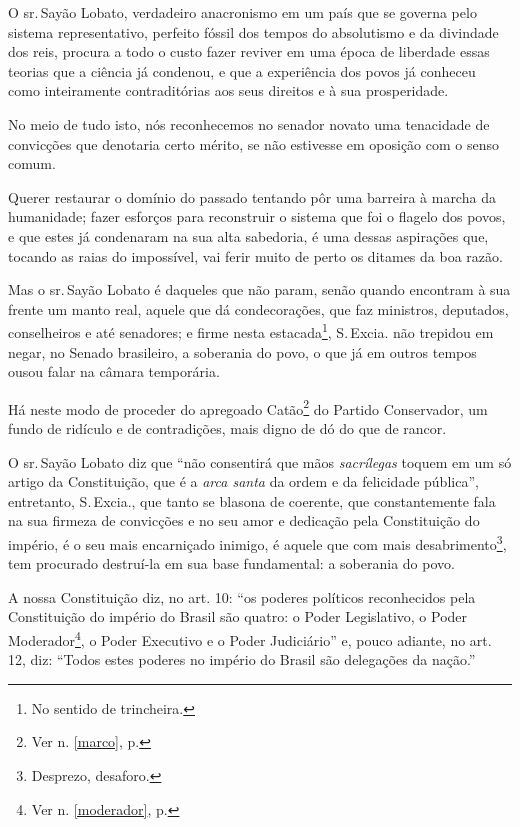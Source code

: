 O sr.\,Sayão Lobato, verdadeiro anacronismo em um país que se governa
pelo sistema representativo, perfeito fóssil dos tempos do absolutismo e
da divindade dos reis, procura a todo o custo fazer reviver em uma época
de liberdade essas teorias que a ciência já condenou, e que a
experiência dos povos já conheceu como inteiramente contraditórias aos
seus direitos e à sua prosperidade.

No meio de tudo isto, nós reconhecemos no senador novato uma tenacidade
de convicções que denotaria certo mérito, se não estivesse em oposição
com o senso comum.

Querer restaurar o domínio do passado tentando pôr uma barreira à marcha
da humanidade; fazer esforços para reconstruir o sistema que foi o
flagelo dos povos, e que estes já condenaram na sua alta sabedoria, é
uma dessas aspirações que, tocando as raias do impossível, vai ferir
muito de perto os ditames da boa razão.

Mas o sr.\,Sayão Lobato é daqueles que não param, senão quando encontram
à sua frente um manto real, aquele que dá condecorações, que faz
ministros, deputados, conselheiros e até senadores; e firme nesta
estacada\footnote{No sentido de trincheira.}, S.\,Excia. não trepidou
em negar, no Senado brasileiro, a soberania do povo, o que já em outros
tempos ousou falar na câmara temporária.

Há neste modo de proceder do apregoado Catão\footnote{Ver n. \ref{marco}, p. \pageref{marco}} 
do Partido Conservador, um fundo de ridículo e de contradições, mais 
digno de dó do que de rancor.

O sr.\,Sayão Lobato diz que ``não consentirá que mãos \emph{sacrílegas}
toquem em um só artigo da Constituição, que é a \emph{arca santa} da
ordem e da felicidade pública'', entretanto, S.\,Excia., que tanto se
blasona de coerente, que constantemente fala na sua firmeza de
convicções e no seu amor e dedicação pela Constituição do império, é o
seu mais encarniçado inimigo, é aquele que com mais
desabrimento\footnote{Desprezo, desaforo.}, tem procurado destruí-la
em sua base fundamental: a soberania do povo.

A nossa Constituição diz, no art. 10: ``os poderes políticos reconhecidos
pela Constituição do império do Brasil são quatro: o Poder Legislativo,
o Poder Moderador\footnote{Ver n. \ref{moderador}, p. \pageref{moderador}}, 
o Poder Executivo e o Poder Judiciário'' e, pouco adiante, no art. 12, diz: 
``Todos estes poderes no império do Brasil são delegações da nação.''

